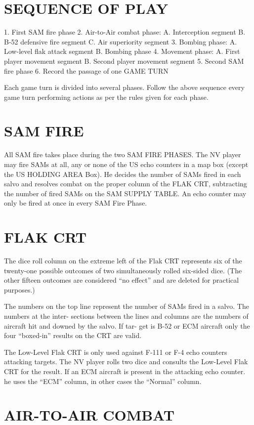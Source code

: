 \section*{SEQUENCE OF PLAY}
1. First SAM fire phase
2. Air-to-Air combat phase:
   A. Interception segment
   B. B-52 defensive fire segment
   C. Air superiority segment
3. Bombing phase:
   A. Low-level flak attack segment
   B. Bombing phase
4. Movement phase:
   A. First player movement segment
   B. Second player movement segment
5. Second SAM fire phase
6. Record the passage of one GAME TURN

Each game turn is divided into 
several phases. Follow the above 
sequence every game turn performing 
actions as per the rules given for each 
phase.

\section*{SAM FIRE}
All SAM fire takes place during the 
two SAM FIRE PHASES. The NV 
player may fire SAMs at all, any or 
none of the US echo counters in a map 
box (except the US HOLDING AREA 
Box). He decides the number of SAMs 
fired in each salvo and resolves 
combat on the proper column of the 
FLAK CRT, subtracting the number 
of fired SAMs on the SAM SUPPLY 
TABLE.
An echo counter may only be fired 
at once in every SAM Fire Phase.
\section*{FLAK CRT}

The dice roll column on the extreme
left of the Flak CRT represents six of
the twenty-one possible outcomes of
two simultaneously rolled six-sided
dice. (The other fifteen outcomes are
considered ``no effect'' and are
deleted for practical purposes.)

The numbers on the top line
represent the number of SAMs fired
in a salvo. The numbers at the inter-
sections between the lines and
columns are the numbers of aircraft
hit and downed by the salvo. If tar-
get is B-52 or ECM aircraft only the
four ``boxed-in'' results on the CRT
are valid.

The Low-Level Flak CRT is only
used against F-111 or F-4 echo
counters attacking targets. The NV
player rolls two dice and consults the
Low-Level Flak CRT for the result. If
an ECM aircraft is present in the
attacking echo counter. he uses the
``ECM'' column, in other cases the
``Normal'' column.

\section*{AIR-TO-AIR COMBAT}

